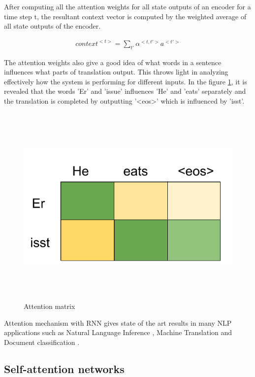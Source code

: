 \documentclass[a4paper, 11pt]{article}
\begin{document}
After computing all the attention weights for all state outputs of an encoder for a time step t, the resultant context vector is computed by the weighted average of all state outputs of the encoder.

\begin{align*}
context^{<t>} = \sum_{t'} \alpha^{<t,t'>} a^{<t'>}
\end{align*} 
 
The attention weights also give a good idea of what words in a sentence influences what parts of translation output. This throws light in analyzing effectively how the system is performing for different inputs. In the figure \ref{fig:attention-matrix-1}, it is revealed that the words 'Er' and 'issue' influences 'He' and 'eats' separately and the translation is completed by outputting '<eos>' which is influenced by 'isst'.

\begin{figure}[H]
    \centering
    \includegraphics[width=\textwidth,height=10cm,keepaspectratio=true]
    {attention-matrix-1.png}
    \caption{
        Attention matrix 
    }
    \label{fig:attention-matrix-1}
\end{figure}

Attention mechanism with RNN gives state of the art results in many NLP applications such as Natural Language Inference \parencite{Parikh2016}, Machine Translation \parencite{bahdanau2014neural} and Document classification \parencite{Yang2016}.

\subsection{Self-attention networks}
\end{document}

